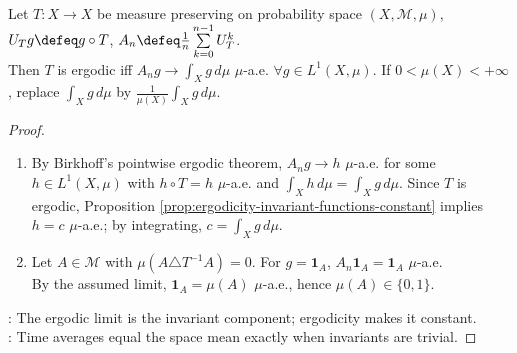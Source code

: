 \begin{theorem} \label{thm:ergodic-averages-characterization} \\
Let $T:X\to X$ be measure preserving on probability space $(X,\mathcal{M},\mu)$, $U_Tg\defeq g\circ T$, $A_n\defeq\frac1n\sum\limits_{k=0}^{n-1}U_T^k$.\\
Then $T$ is ergodic iff $A_ng\to\int_Xg\,d\mu$ $\mu$-a.e. $\forall g\in L^1(X,\mu)$.
If $0<\mu(X)<+\infty$, replace $\int_Xg\,d\mu$ by $\frac{1}{\mu(X)}\int_Xg\,d\mu$.
\begin{proof}
\begin{enumerate}[label=\roman*.]
\setlength{\itemsep}{0pt}
\item[$(\Rightarrow)$] By Birkhoff's pointwise ergodic theorem, $A_ng\to h$ $\mu$-a.e. for some $h\in L^1(X,\mu)$ with $h\circ T=h$ $\mu$-a.e. and $\int_Xh\,d\mu=\int_Xg\,d\mu$. Since $T$ is ergodic, Proposition \ref{prop:ergodicity-invariant-functions-constant} implies $h=c$ $\mu$-a.e.; by integrating, $c=\int_Xg\,d\mu$.
\item[$(\Leftarrow)$] Let $A\in\mathcal{M}$ with $\mu(A\triangle T^{-1}A)=0$. For $g=\mathbf{1}_A$, $A_n\mathbf{1}_A=\mathbf{1}_A$ $\mu$-a.e.\\
By the assumed limit, $\mathbf{1}_A=\mu(A)$ $\mu$-a.e., hence $\mu(A)\in\{0,1\}$.
\end{enumerate}
: The ergodic limit is the invariant component; ergodicity makes it constant.\\
: Time averages equal the space mean exactly when invariants are trivial.
\end{proof}
\end{theorem}

